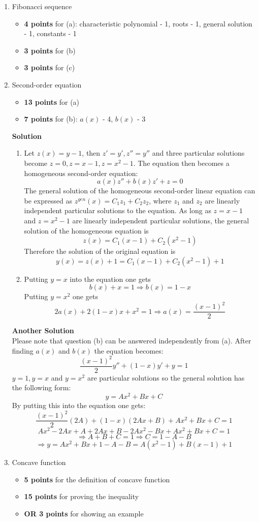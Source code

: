 \documentclass[12pt]{article} %
\theoremstyle{definition} %
\begin{document}
\begin{enumerate}
\item Fibonacci sequence
\begin{itemize}
    \item \textbf{4 points} for (a): characteristic polynomial - 1, roots - 1, general solution - 1, constants - 1
    \item \textbf{3 points} for (b)
    \item \textbf{3 points} for (c)
\end{itemize}

\item Second-order equation
\begin{itemize}
    \item \textbf{13 points} for (a)
    \item \textbf{7 points} for (b): $a(x)$ - 4, $b(x)$ - 3
\end{itemize}

\textbf{Solution} \\
\begin{enumerate}
\item Let $z(x)=y-1$, then $z'=y', z''=y''$ and three particular solutions become $z=0, z=x-1, z=x^2-1$. The equation then becomes a homogeneous second-order equation:
\[
a(x)z''+b(x)z'+z=0
\]
The general solution of the homogeneous second-order linear equation can be expressed as $z^{gen}(x) = C_1z_1+C_2z_2$, where $z_1$ and $z_2$ are linearly independent particular solutions to the equation. As long as $z=x-1$ and $z=x^2-1$ are linearly independent particular solutions, the general solution of the homogeneous equation is
\[z(x) = C_1(x-1)+C_2(x^2-1)\]
Therefore the solution of the original equation is
\[
y(x) = z(x) + 1 = C_1(x-1)+C_2(x^2-1)+1
\]
\item Putting $y=x$ into the equation one gets
\[b(x) + x = 1 \Longrightarrow b(x) = 1-x\]
Putting $y=x^2$ one gets
\[2a(x) + 2(1-x)x + x^2 = 1 \Longrightarrow a(x) = \frac{(x-1)^2}{2}\]
\end{enumerate}


\textbf{Another Solution} \\
Please note that question (b) can be answered independently from (a).
After finding $a(x)$ and $b(x)$ the equation becomes:
\[
\frac {(x-1)^2}{2} y'' + (1-x)y' + y=1
\]
$y=1,y=x$ and $y=x^2$ are particular solutions so the general solution has the following form:
\[y=Ax^2+Bx+C\]
By putting this into the equation one gets:
\[
\frac {(x-1)^2}{2} (2A) + (1-x)(2Ax+B) + Ax^2+Bx+C=1
\]
\[ Ax^2-2Ax+A+2Ax+B-2Ax^2-Bx+Ax^2+Bx+C=1 \]
\[ \Longrightarrow A+B+C=1 \Longrightarrow C=1-A-B \]
\[
\Longrightarrow y = Ax^2+Bx+1-A-B=A(x^2-1)+B(x-1)+1
\]


\item Concave function
\begin{itemize}
    \item \textbf{5 points} for the definition of concave function
    \item \textbf{15 points} for proving the inequality
    \item \textbf{OR 3 points} for showing an example
\end{itemize}
\end{enumerate}
\end{document}
